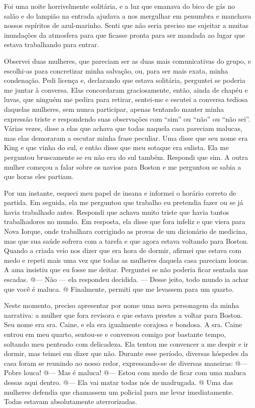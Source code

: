 Foi uma noite horrivelmente solitária, e a luz que emanava do bico de
gás no salão e do lampião na entrada ajudava a nos mergulhar em penumbra
e manchava nossos espíritos de azul-marinho. Senti que não seria preciso
me sujeitar a muitas inundações da atmosfera para que ficasse pronta
para ser mandada ao lugar que estava trabalhando para entrar.

Observei
duas mulheres, que pareciam ser as duas mais comunicativas do grupo, e
escolhi-as para concretizar minha salvação, ou, para ser mais exata,
minha condenação. Pedi licença e, declarando que estava solitária,
perguntei se poderia me juntar à conversa. Elas concordaram
graciosamente, então, ainda de chapéu e luvas, que ninguém me pedira
para retirar, sentei-me e escutei a conversa tediosa daquelas mulheres,
sem nunca participar, apenas tentando manter minha expressão triste e
respondendo suas observações com ``sim'' ou ``não'' ou ``não sei''.
Várias vezes, disse a elas que achava que todas naquela casa pareciam
malucas, mas elas demoraram a escutar minha frase peculiar. Uma disse
que seu nome era King e que vinha do sul, e então disse que meu sotaque
era sulista. Ela me perguntou bruscamente se eu não era do sul também.
Respondi que sim. A outra mulher começou a falar sobre os navios para
Boston e me perguntou se sabia a que horas eles partiam.

Por um instante, esqueci meu papel de insana e informei o horário
correto de partida. Em seguida, ela me perguntou que trabalho eu
pretendia fazer ou se já havia trabalhado antes. Respondi que achava
muito triste que havia tantos trabalhadores no mundo. Em resposta, ela
disse que fora infeliz e que viera para Nova Iorque, onde trabalhara
corrigindo as provas de um dicionário de medicina, mas que sua saúde
sofrera com a tarefa e que agora estava voltando para Boston. Quando a
criada veio nos dizer que era hora de dormir, afirmei que estava com
medo e repeti mais uma vez que todas as mulheres daquela casa pareciam
loucas. A ama insistiu que eu fosse me deitar. Perguntei se não poderia
ficar sentada nas escadas. @--- Não --- ela respondeu decidida. ---
Desse jeito, todo mundo ia achar que você é maluca. @ Finalmente,
permiti que me levassem para um quarto.

Neste momento, preciso apresentar por nome uma nova personagem da minha
narrativa: a mulher que fora revisora e que estava prestes a voltar para
Boston. Seu nome era sra. Caine, e ela era igualmente corajosa e
bondosa. A sra. Caine entrou em meu quarto, sentou-se e conversou comigo
por bastante tempo, soltando meu penteado com delicadeza. Ela tentou me
convencer a me despir e ir dormir, mas teimei em dizer que não. Durante
esse período, diversas hóspedes da casa foram se reunindo ao nosso
redor, expressando-se de diversas maneiras: @--- Pobre louca! @--- Mas é
maluca! @--- Estou com medo de ficar com uma maluca dessas aqui dentro.
@--- Ela vai matar todas nós de madrugada. @ Uma das mulheres defendia
que chamassem um policial para me levar imediatamente. Todas estavam
absolutamente aterrorizadas.

